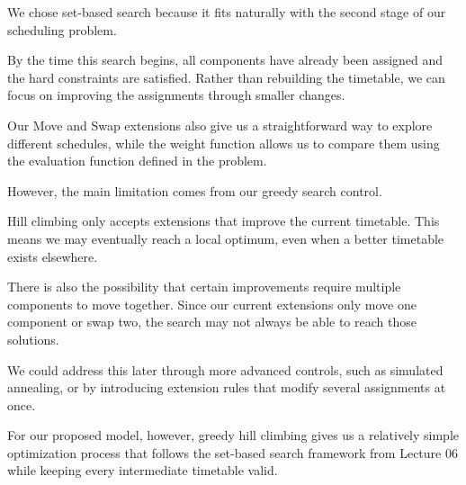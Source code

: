 We chose set-based search because it fits naturally with the second stage of our scheduling problem.

By the time this search begins, all components have already been assigned and the hard constraints are satisfied. Rather than rebuilding the timetable, we can focus on improving the assignments through smaller changes.

Our Move and Swap extensions also give us a straightforward way to explore different schedules, while the weight function allows us to compare them using the evaluation function defined in the problem.

However, the main limitation comes from our greedy search control.

Hill climbing only accepts extensions that improve the current timetable. This means we may eventually reach a local optimum, even when a better timetable exists elsewhere.

There is also the possibility that certain improvements require multiple components to move together. Since our current extensions only move one component or swap two, the search may not always be able to reach those solutions.

We could address this later through more advanced controls, such as simulated annealing, or by introducing extension rules that modify several assignments at once.

For our proposed model, however, greedy hill climbing gives us a relatively simple optimization process that follows the set-based search framework from Lecture 06 while keeping every intermediate timetable valid.
